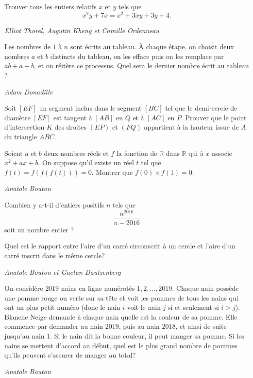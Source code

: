 \begin{exo}{}
Trouver tous les entiers relatifs $x$ et $y$ tels que \[x^2y+7x=x^2+3xy+3y+4.\]

\medskip
\textit{Elliot Thorel, Augutin Kheng et Camille Ordenneau}
\end{exo}

\begin{exo}{}
Les nombres de $1$ à $n$ sont écrits au tableau. \`A chaque étape, on choisit deux nombres $a$ et $b$ distincts du tableau, on les efface puis on les remplace par $ab+a+b$, et on réitère ce processus. Quel sera le dernier nombre écrit au tableau ?

\medskip
\textit{Adam Donadille}
\end{exo}

\begin{exo}{}Soit $[EF]$ un segment inclus dans le segment $[BC]$ tel que le demi-cercle de diamètre $[EF]$ est tangent à $[AB]$ en $Q$ et à $[AC]$ en $P$. Prouver que le point d'intersection $K$ des droites $(EP)$ et $(FQ)$ appartient à la hauteur issue de $A$ du triangle $ABC$.
\end{exo}

\begin{exo}{}
Soient $a$ et $b$ deux nombres réels et $f$ la fonction de $\mathbb{R}$ dans $\mathbb{R}$ qui à $x$ associe $x^2+ax+b$. On suppose qu'il existe un réel $t$ tel que $f(t)=f(f(f(t)))=0$. Montrer que $f(0) \times f(1)=0$.

\medskip
\textit{Anatole Bouton}
\end{exo}

\begin{exo}{}
Combien y a-t-il d'entiers positifs $n$ tels que
\[\frac{n^{2016}}{n-2016}\]
soit un nombre entier ?
\end{exo}

\begin{exo}{}
Quel est le rapport entre l'aire d'un carré circonscrit à un cercle et l'aire d'un carré inscrit dans le même cercle?

\medskip
\textit{Anatole Bouton et Gaetan Dautzenberg}
\end{exo}

\begin{exo}{}
On considère $2019$ nains en ligne numérotés $1,2,...,2019$. Chaque nain possède une pomme rouge ou verte sur sa tête et voit les pommes de tous les nains qui ont un plus petit numéro (donc le nain $i$ voit le nain $j$ si et seulement si $i>j$). Blanche Neige demande à chaque nain quelle est la couleur de sa pomme. Elle commence par demander au nain $2019$, puis au nain $2018$, et ainsi de suite jusqu'au nain $1$. Si le nain dit la bonne couleur, il peut manger sa pomme. Si les nains se mettent d'accord au début, quel est le plus grand nombre de pommes qu'ils peuvent s'assurer de manger au total?

\medskip
\textit{Anatole Bouton}

\end{exo}

